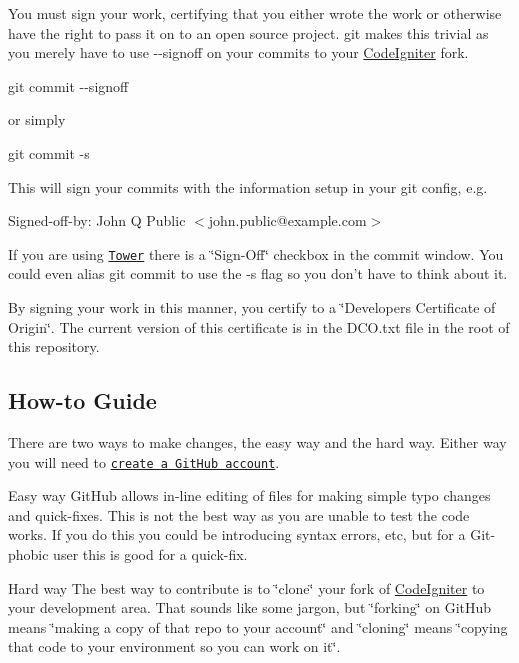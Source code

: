 You must sign your work, certifying that you either wrote the work or otherwise have the right to pass it on to an open source project. git makes this trivial as you merely have to use {\ttfamily -\/-\/signoff} on your commits to your \hyperlink{namespace_code_igniter}{Code\+Igniter} fork.

{\ttfamily git commit -\/-\/signoff}

or simply

{\ttfamily git commit -\/s}

This will sign your commits with the information setup in your git config, e.\+g.

{\ttfamily Signed-\/off-\/by\+: John Q Public $<$john.\+public@example.\+com$>$}

If you are using \href{http://www.git-tower.com/}{\tt Tower} there is a \char`\"{}\+Sign-\/\+Off\char`\"{} checkbox in the commit window. You could even alias git commit to use the {\ttfamily -\/s} flag so you don’t have to think about it.

By signing your work in this manner, you certify to a \char`\"{}\+Developer\textquotesingle{}s Certificate of Origin\char`\"{}. The current version of this certificate is in the {\ttfamily D\+C\+O.\+txt} file in the root of this repository.

\subsection*{How-\/to Guide}

There are two ways to make changes, the easy way and the hard way. Either way you will need to \href{https://github.com/signup/free}{\tt create a Git\+Hub account}.

Easy way Git\+Hub allows in-\/line editing of files for making simple typo changes and quick-\/fixes. This is not the best way as you are unable to test the code works. If you do this you could be introducing syntax errors, etc, but for a Git-\/phobic user this is good for a quick-\/fix.

Hard way The best way to contribute is to \char`\"{}clone\char`\"{} your fork of \hyperlink{namespace_code_igniter}{Code\+Igniter} to your development area. That sounds like some jargon, but \char`\"{}forking\char`\"{} on Git\+Hub means \char`\"{}making a copy of that repo to your account\char`\"{} and \char`\"{}cloning\char`\"{} means \char`\"{}copying that code to your environment so you can work on it\char`\"{}.



